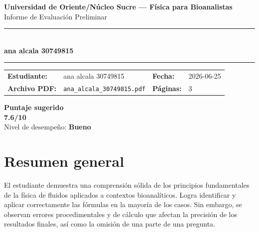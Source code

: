 \documentclass[11pt,a4paper]{article}
\begin{document}
\begin{center}
  {\Large\bfseries\color{azulTitulo} Universidad de Oriente/Núcleo Sucre --- Física para Bioanalistas}\\[4pt]
  {\large Informe de Evaluación Preliminar}\\[12pt]
  \rule{\linewidth}{1.2pt}\\[6pt]
  {\LARGE\bfseries ana alcala 30749815}\\[4pt]
  \rule{\linewidth}{0.6pt}
\end{center}

\vspace{4pt}
\begin{tcolorbox}[cajaTitulo, title=Datos del informe]
\begin{tabular}{@{}llll@{}}
  \textbf{Estudiante:}  & ana alcala 30749815  &
  \textbf{Fecha:}       & 2026-06-25 \\[4pt]
  \textbf{Archivo PDF:} & \texttt{ana\_alcala\_30749815.pdf}  &
  \textbf{Páginas:}     & 3 \\
\end{tabular}
\end{tcolorbox}

\vspace{6pt}
\begin{center}
  \begin{tcolorbox}[
    enhanced,
    colback=white, colframe=desempeno_bueno,
    width=0.62\linewidth,
    boxrule=2pt,
    halign=center, valign=center,
    top=8pt, bottom=8pt,
  ]
    \centering
    {\large\bfseries Puntaje sugerido}\\[6pt]
    {\Huge\bfseries\color{desempeno_bueno} 7.6/10}\\[6pt]
    {\large Nivel de desempeño: \textbf{\color{desempeno_bueno} Bueno}}
  \end{tcolorbox}
\end{center}

\section*{Resumen general}
El estudiante demuestra una comprensión sólida de los principios fundamentales de la física de fluidos aplicados a contextos bioanalíticos. Logra identificar y aplicar correctamente las fórmulas en la mayoría de los casos. Sin embargo, se observan errores procedimentales y de cálculo que afectan la precisión de los resultados finales, así como la omisión de una parte de una pregunta.
\end{document}
